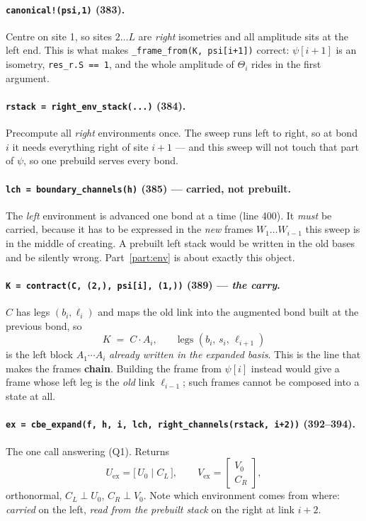\documentclass[11pt,a4paper]{article}
\newcommand{\code}[1]{\texttt{\small #1}}
\newcommand{\Uex}{U_{\mathrm{ex}}}
\newcommand{\Vex}{V_{\mathrm{ex}}}
\begin{document}
\paragraph{\code{canonical!(psi,1)} (383).} Centre on site 1, so sites $2\dots L$ are
\emph{right} isometries and all amplitude sits at the left end. This is what makes
\code{\_frame\_from(K, psi[i+1])} correct: $\psi[i+1]$ is an isometry, \code{res\_r.S == 1},
and the whole amplitude of $\Theta_i$ rides in the first argument.

\paragraph{\code{rstack = right\_env\_stack(...)} (384).} Precompute all \emph{right}
environments once. The sweep runs left to right, so at bond $i$ it needs everything right of
site $i+1$ --- and this sweep will not touch that part of $\psi$, so one prebuild serves every
bond.

\paragraph{\code{lch = boundary\_channels(h)} (385) --- carried, not prebuilt.} The
\emph{left} environment is advanced one bond at a time (line 400). It \emph{must} be carried,
because it has to be expressed in the \emph{new} frames $W_1\dots W_{i-1}$ this sweep is in the
middle of creating. A prebuilt left stack would be written in the old bases and be silently
wrong. Part~\ref{part:env} is about exactly this object.

\paragraph{\code{K = contract(C, (2,), psi[i], (1,))} (389) --- \emph{the carry}.} $C$ has legs
$(b_i,\ell_i)$ and maps the old link into the augmented bond built at the previous bond, so
\[
  K \;=\; C\cdot A_i,\qquad \text{legs } (b_i,\, s_i,\, \ell_{i+1})
\]
is the left block $A_1\cdots A_i$ \emph{already written in the expanded basis}. This is the
line that makes the frames \textbf{chain}. Building the frame from $\psi[i]$ instead would give
a frame whose left leg is the \emph{old} link $\ell_{i-1}$; such frames cannot be composed into
a state at all.

\paragraph{\code{ex = cbe\_expand(f, h, i, lch, right\_channels(rstack, i+2))} (392--394).}
The one call answering (Q1). Returns
\[
  \Uex = \big[\,U_0 \mid C_L\,\big],\qquad
  \Vex = \begin{bmatrix}V_0\\ C_R\end{bmatrix},
\]
orthonormal, $C_L\perp U_0$, $C_R\perp V_0$. Note which environment comes from where:
\emph{carried} on the left, \emph{read from the prebuilt stack} on the right at link $i+2$.
\end{document}
